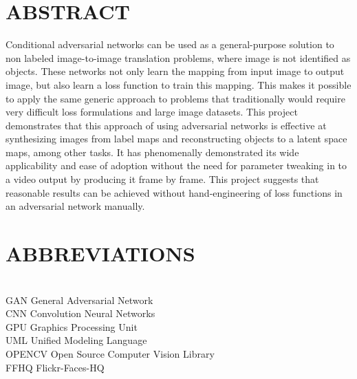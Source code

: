 \documentclass[12pt, a4paper]{report}
\begin{document}
\chapter*{ABSTRACT} \vspace{8pt}

%

\justify

{\large{Conditional adversarial networks can be used as a
general-purpose solution to non labeled image-to-image translation
problems, where image is not identified as objects. These networks not only learn the mapping from input image to output image, but also learn a loss function to train this mapping. This makes it possible to apply
the same generic approach to problems that traditionally
would require very difficult loss formulations and large image datasets. This project demonstrates that this approach of using adversarial networks is effective at synthesizing images 
from label maps and reconstructing objects to a latent space maps, among other tasks. It has phenomenally 
demonstrated its wide applicability and ease of adoption
without the need for parameter tweaking in to a video output by producing it frame by frame. This project suggests that reasonable results can be achieved
without hand-engineering of loss functions in an adversarial network manually.}

}

\newpage
\listoffigures
{}
\newpage
\chapter*{ABBREVIATIONS} \vspace{8pt}

%


\large{{ \hspace{40mm}  \\
 \hspace{20mm} GAN \hspace{39mm} General Adversarial Network \\
 \hspace{20mm} CNN \hspace{39mm} Convolution Neural Networks \\
 \hspace{20mm} GPU \hspace{39mm} Graphics Processing Unit \\
 \hspace{20mm} UML \hspace{39mm} Unified Modeling Language \\
 \hspace{20mm} OPENCV \hspace{29mm} Open Source Computer Vision Library \\
 \hspace{20mm} FFHQ \hspace{37mm} Flickr-Faces-HQ\\
}}
\end{document}
